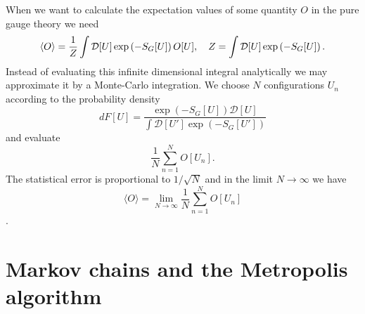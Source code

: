 When we want to calculate the expectation values of some quantity $O$ in the pure gauge theory we need
\begin{equation}
    \langle O\rangle=\frac{1}{Z} \int\mathcal D[U]\exp\left(-S_G[U]\right)O[U],\quad Z=\int \mathcal D[U]\exp\left(-S_G[U]\right).
\end{equation}
Instead of evaluating this infinite dimensional integral analytically we may approximate it by a Monte-Carlo integration. We choose $N$ configurations $U_n$ according to the probability density 
\begin{equation}
    dF[U]=\frac{\exp(-S_G[U])\mathcal D[U]}{\int\mathcal D[U']\exp(-S_G[U'])}
\end{equation}
and evaluate
\begin{equation}
    \frac{1}{N}\sum_{n=1}^NO[U_n].
\end{equation}
The statistical error is proportional to $1/\sqrt{N}$ and in the limit $N\to\infty$ we have
\begin{equation}
    \langle O\rangle=\underset{N\to\infty}{\lim}\frac{1}{N}\sum_{n=1}^NO[U_n]
\end{equation}
\cite{gattringer}.
\section{Markov chains and the Metropolis algorithm}

